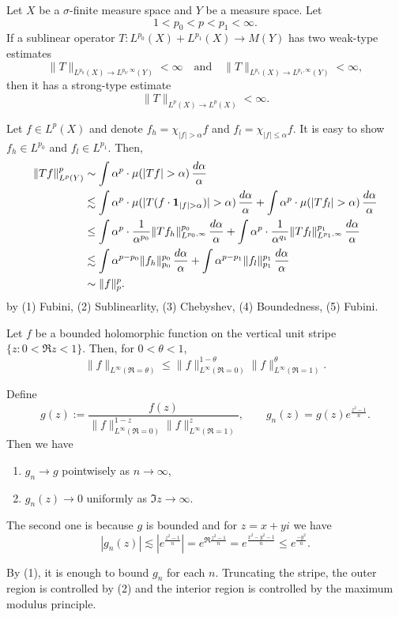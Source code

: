 \documentclass{../../large}
\begin{document}
\begin{prb}
Let $X$ be a $\sigma$-finite measure space and $Y$ be a measure space.
Let
\[1<p_0<p<p_1<\infty.\]
If a sublinear operator $T\colon L^{p_0}(X)+L^{p_1}(X)\to M(Y)$ has two weak-type estimates
\[\|T\|_{L^{p_0}(X)\to L^{p_0,\infty}(Y)}<\infty\quad\text{and}\quad\|T\|_{L^{p_1}(X)\to L^{p_1,\infty}(Y)}<\infty,\]
then it has a strong-type estimate
\[\|T\|_{L^p(X)\to L^p(X)}<\infty.\]
\end{prb}
\begin{pf}
Let $f\in L^p(X)$ and denote $f_h=\chi_{|f|>\alpha}f$ and $f_l=\chi_{|f|\le\alpha}f$.
It is easy to show $f_h\in L^{p_0}$ and $f_l\in L^{p_1}$.
Then,
\begin{align*} %
\|Tf\|_{L^p(Y)}^p&\sim\int\alpha^p\cdot\mu(|Tf|>\alpha)\,\frac{d\alpha}\alpha\\
&\lesssim\int\alpha^p\cdot\mu(|T(f\cdot\1_{|f|>\alpha})|>\alpha)\,\frac{d\alpha}\alpha+\int\alpha^p\cdot\mu(|Tf_l|>\alpha)\,\frac{d\alpha}\alpha\\
&\le\int\alpha^p\cdot\frac1{\alpha^{p_0}}\|Tf_h\|_{L^{p_0,\infty}}^{p_0}\,\frac{d\alpha}\alpha+\int\alpha^p\cdot\frac1{\alpha^{q_1}}\|Tf_l\|_{L^{p_1,\infty}}^{p_1}\,\frac{d\alpha}\alpha\\
&\lesssim\int\alpha^{p-p_0}\|f_h\|_{p_0}^{p_0}\,\frac{d\alpha}\alpha+\int\alpha^{p-p_1}\|f_l\|_{p_1}^{p_1}\,\frac{d\alpha}\alpha\\
&\sim\|f\|_p^p.
\end{align*}
by (1) Fubini, (2) Sublinearlity, (3) Chebyshev, (4) Boundedness, (5) Fubini.
\end{pf}

\begin{prb}
Let $f$ be a bounded holomorphic function on the vertical unit stripe $\{z:0<\Re z<1\}$.
Then, for $0<\theta<1$,
\[\|f\|_{L^\infty(\Re=\theta)}\le\|f\|_{L^\infty(\Re=0)}^{1-\theta}\|f\|_{L^\infty(\Re=1)}^\theta.\]
\end{prb}
\begin{pf}
Define
\[g(z):=\frac{f(z)}{\|f\|_{L^\infty(\Re=0)}^{1-z}\|f\|_{L^\infty(\Re=1)}^z},\qquad g_n(z)=g(z)e^\frac{z^2-1}n.\]
Then we have
\begin{enumerate}
\item $g_n\to g$ pointwisely as $n\to\infty$,
\item $g_n(z)\to0$ uniformly as $\Im z\to\infty$.
\end{enumerate}
The second one is because $g$ is bounded and for $z=x+yi$ we have
\[|g_n(z)|\lesssim|e^\frac{z^2-1}n|=e^{\Re\frac{z^2-1}n}=e^\frac{x^2-y^2-1}n\le e^\frac{-y^2}n.\]

By (1), it is enough to bound $g_n$ for each $n$.
Truncating the stripe, the outer region is controlled by (2) and the interior region is controlled by the maximum modulus principle.
\end{pf}
\end{document}
